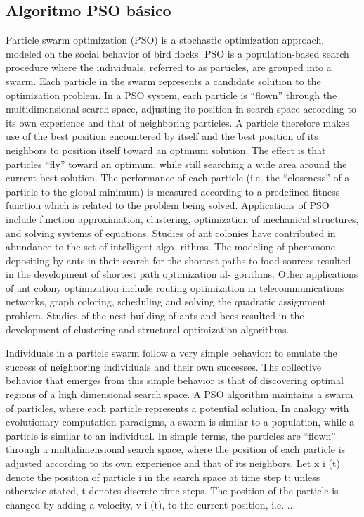 \documentclass{article}
\begin{document}
\subsection{Algoritmo PSO básico}
Particle swarm optimization (PSO) is a stochastic optimization approach, modeled on
the social behavior of bird flocks. PSO is a population-based search procedure where
the individuals, referred to as particles, are grouped into a swarm. Each particle in
the swarm represents a candidate solution to the optimization problem. In a PSO
system, each particle is “flown” through the multidimensional search space, adjusting
its position in search space according to its own experience and that of neighboring
particles. A particle therefore makes use of the best position encountered by itself
and the best position of its neighbors to position itself toward an optimum solution.
The effect is that particles “fly” toward an optimum, while still searching a wide area
around the current best solution. The performance of each particle (i.e. the “closeness”
of a particle to the global minimum) is measured according to a predefined fitness
function which is related to the problem being solved. Applications of PSO include
function approximation, clustering, optimization of mechanical structures, and solving
systems of equations.
Studies of ant colonies have contributed in abundance to the set of intelligent algo-
rithms. The modeling of pheromone depositing by ants in their search for the shortest
paths to food sources resulted in the development of shortest path optimization al-
gorithms. Other applications of ant colony optimization include routing optimization
in telecommunications networks, graph coloring, scheduling and solving the quadratic
assignment problem. Studies of the nest building of ants and bees resulted in the
development of clustering and structural optimization algorithms.

Individuals in a particle swarm follow a very simple behavior: to emulate the success of
neighboring individuals and their own successes. The collective behavior that emerges
from this simple behavior is that of discovering optimal regions of a high dimensional
search space.
A PSO algorithm maintains a swarm of particles, where each particle represents a
potential solution. In analogy with evolutionary computation paradigms, a swarm is similar to a population, while a particle is similar to an individual. In simple terms,
the particles are “flown” through a multidimensional search space, where the position
of each particle is adjusted according to its own experience and that of its neighbors.
Let x i (t) denote the position of particle i in the search space at time step t; unless
otherwise stated, t denotes discrete time steps. The position of the particle is changed
by adding a velocity, v i (t), to the current position, i.e. ...
\end{document}
